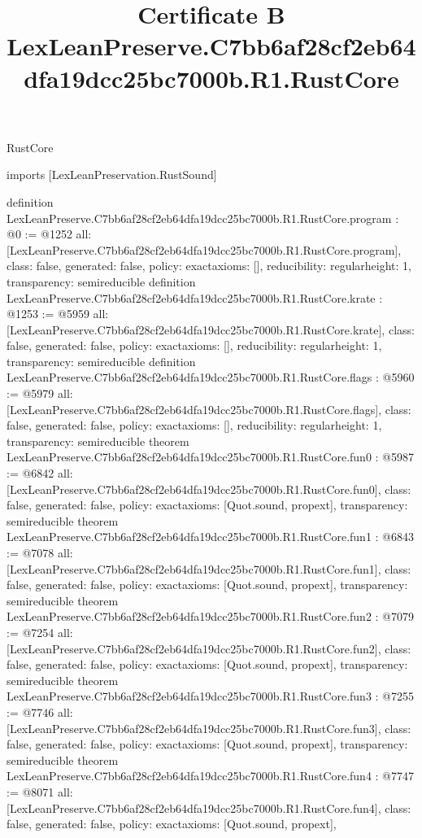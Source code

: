 \begin{lexlean}{RustCore}
\title{Certificate B LexLeanPreserve.C7bb6af28cf2eb64dfa19dcc25bc7000b.R1.RustCore}
\begin{coremodule}
imports [LexLeanPreservation.RustSound]

definition LexLeanPreserve.C7bb6af28cf2eb64dfa19dcc25bc7000b.R1.RustCore.program : @0 := @1252 {
  all: [LexLeanPreserve.C7bb6af28cf2eb64dfa19dcc25bc7000b.R1.RustCore.program],
  class: false,
  generated: false,
  policy: exact{axioms: []},
  reducibility: regular{height: 1},
  transparency: semireducible
}
definition LexLeanPreserve.C7bb6af28cf2eb64dfa19dcc25bc7000b.R1.RustCore.krate : @1253 := @5959 {
  all: [LexLeanPreserve.C7bb6af28cf2eb64dfa19dcc25bc7000b.R1.RustCore.krate],
  class: false,
  generated: false,
  policy: exact{axioms: []},
  reducibility: regular{height: 1},
  transparency: semireducible
}
definition LexLeanPreserve.C7bb6af28cf2eb64dfa19dcc25bc7000b.R1.RustCore.flags : @5960 := @5979 {
  all: [LexLeanPreserve.C7bb6af28cf2eb64dfa19dcc25bc7000b.R1.RustCore.flags],
  class: false,
  generated: false,
  policy: exact{axioms: []},
  reducibility: regular{height: 1},
  transparency: semireducible
}
theorem LexLeanPreserve.C7bb6af28cf2eb64dfa19dcc25bc7000b.R1.RustCore.fun0 : @5987 := @6842 {
  all: [LexLeanPreserve.C7bb6af28cf2eb64dfa19dcc25bc7000b.R1.RustCore.fun0],
  class: false,
  generated: false,
  policy: exact{axioms: [Quot.sound, propext]},
  transparency: semireducible
}
theorem LexLeanPreserve.C7bb6af28cf2eb64dfa19dcc25bc7000b.R1.RustCore.fun1 : @6843 := @7078 {
  all: [LexLeanPreserve.C7bb6af28cf2eb64dfa19dcc25bc7000b.R1.RustCore.fun1],
  class: false,
  generated: false,
  policy: exact{axioms: [Quot.sound, propext]},
  transparency: semireducible
}
theorem LexLeanPreserve.C7bb6af28cf2eb64dfa19dcc25bc7000b.R1.RustCore.fun2 : @7079 := @7254 {
  all: [LexLeanPreserve.C7bb6af28cf2eb64dfa19dcc25bc7000b.R1.RustCore.fun2],
  class: false,
  generated: false,
  policy: exact{axioms: [Quot.sound, propext]},
  transparency: semireducible
}
theorem LexLeanPreserve.C7bb6af28cf2eb64dfa19dcc25bc7000b.R1.RustCore.fun3 : @7255 := @7746 {
  all: [LexLeanPreserve.C7bb6af28cf2eb64dfa19dcc25bc7000b.R1.RustCore.fun3],
  class: false,
  generated: false,
  policy: exact{axioms: [Quot.sound, propext]},
  transparency: semireducible
}
theorem LexLeanPreserve.C7bb6af28cf2eb64dfa19dcc25bc7000b.R1.RustCore.fun4 : @7747 := @8071 {
  all: [LexLeanPreserve.C7bb6af28cf2eb64dfa19dcc25bc7000b.R1.RustCore.fun4],
  class: false,
  generated: false,
  policy: exact{axioms: [Quot.sound, propext]},
}
\end{coremodule}
\end{lexlean}
